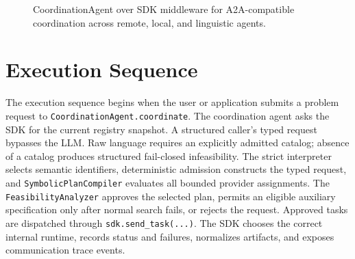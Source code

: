 \begin{figure}[htbp]
\centering
{}
\caption{CoordinationAgent over SDK middleware for A2A-compatible coordination across remote, local, and linguistic agents.}
\label{fig:implementation-architecture}
\end{figure}

\section{Execution Sequence}

The execution sequence begins when the user or application submits a problem request to \texttt{CoordinationAgent.coordinate}. The coordination agent asks the SDK for the current registry snapshot. A structured caller's typed request bypasses the LLM. Raw language requires an explicitly admitted catalog; absence of a catalog produces structured fail-closed infeasibility. The strict interpreter selects semantic identifiers, deterministic admission constructs the typed request, and \texttt{SymbolicPlanCompiler} evaluates all bounded provider assignments. The \texttt{FeasibilityAnalyzer} approves the selected plan, permits an eligible auxiliary specification only after normal search fails, or rejects the request. Approved tasks are dispatched through \texttt{sdk.send\_task(...)}. The SDK chooses the correct internal runtime, records status and failures, normalizes artifacts, and exposes communication trace events.

